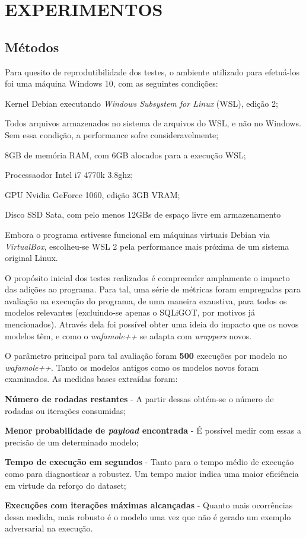 \chapter{EXPERIMENTOS}
\label{chp:capitulo5}

\section{Métodos}

Para quesito de reprodutibilidade dos testes, o ambiente utilizado para efetuá-los foi uma máquina Windows 10, com as seguintes condições:

\begin{alineas}
    \item Kernel Debian executando \textit{Windows Subsystem for Linux} (WSL), edição 2;
    \item Todos arquivos armazenados no sistema de arquivos do WSL, e não no Windows. Sem essa condição, a performance sofre consideravelmente;
    \item 8GB de memória RAM, com 6GB alocados para a execução WSL;
    \item Processaodor Intel i7 4770k 3.8ghz;
    \item GPU Nvidia GeForce 1060, edição 3GB VRAM;
    \item Disco SSD Sata, com pelo menos 12GBs de espaço livre em armazenamento
\end{alineas}

Embora o programa estivesse funcional em máquinas virtuais Debian via \textit{VirtualBox}, escolheu-se WSL 2 pela performance mais próxima de um sistema original Linux.

O propósito inicial dos testes realizados é compreender amplamente o impacto das adições ao programa. Para tal, uma série de métricas foram empregadas para avaliação na execução do programa, de uma maneira exaustiva, para todos os modelos relevantes (excluindo-se apenas o SQLiGOT, por motivos já mencionados). Através dela foi possível obter uma ideia do impacto que os novos modelos têm, e como o \textit{wafamole++} se adapta com \textit{wrappers} novos.

O parâmetro principal para tal avaliação foram \textbf{500} execuções por modelo no \textit{wafamole++}. Tanto os modelos antigos como os modelos novos foram examinados. As medidas bases extraídas foram:
\begin{alineas}
\item \textbf{Número de rodadas restantes} - A partir dessas obtém-se o número de rodadas ou iterações consumidas;
\item \textbf{Menor probabilidade de \textit{payload} encontrada} - É possível medir com essas a precisão de um determinado modelo;
\item \textbf{Tempo de execução em segundos} - Tanto para o tempo médio de execução como para diagnosticar a robustez. Um tempo maior indica uma maior eficiência em virtude da reforço do dataset;
\item \textbf{Execuções com iterações máximas alcançadas} - Quanto mais ocorrências dessa medida, mais robusto é o modelo uma vez que não é gerado um exemplo adversarial na execução.
\end{alineas}


